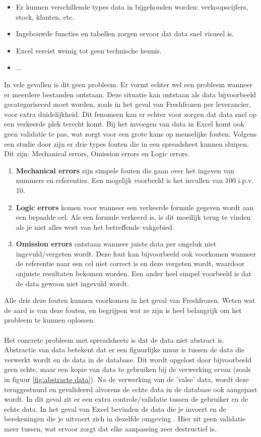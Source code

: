 \begin{itemize}
    \item Er kunnen verschillende types data in bijgehouden worden: verkoopscijfers, stock, klanten, etc.
    \item Ingebouwde functies en tabellen zorgen ervoor dat data snel visueel is.
    \item Excel vereist weinig tot geen technische kennis.
    \item ...
\end{itemize}
In vele gevallen is dit geen probleem. Er vormt echter wel een probleem wanneer er meerdere bestanden ontstaan. Deze situatie kan ontstaan als data bijvoorbeeld gecategoriseerd moet worden, zoals in het geval van Freshfrozen per leverancier, voor extra duidelijkheid. Dit fenomeen kan er echter voor zorgen dat data snel op een verkeerde plek terecht komt. Bij het invoegen van data in Excel komt ook geen validatie te pas, wat zorgt voor een grote kans op menselijke fouten. Volgens een studie door \textcite{Aburas2019} zijn er drie types fouten die in een spreadsheet kunnen sluipen. Dit zijn: Mechanical errors, Omission errors en Logic errors. 
\begin{enumerate}
    \item \textbf{Mechanical errors} zijn simpele fouten die gaan over het ingeven van nummers en referenties. Een mogelijk voorbeeld is het invullen van 100 i.p.v. 10.
    \item \textbf{Logic errors} komen voor wanneer een verkeerde formule gegeven wordt aan een bepaalde cel. Als een formule verkeerd is, is dit moeilijk terug te vinden als je niet alles weet van het betreffende vakgebied.
    \item \textbf{Omission errors} ontstaan wanneer juiste data per ongeluk niet ingevuld/vergeten wordt. Deze fout kan bijvoorbeeld ook voorkomen wanneer de referentie naar een cel niet correct is en deze vergeten wordt, waardoor onjuiste resultaten bekomen worden. Een ander heel simpel voorbeeld is dat de data gewoon niet ingevuld wordt.
\end{enumerate}
  Alle drie deze fouten kunnen voorkomen in het geval van Freshfrozen. Weten wat de aard is van deze fouten, en begrijpen wat ze zijn is heel belangrijk om het probleem te kunnen oplossen.
 \\
 \\
Het concrete probleem met spreadsheets is dat de data niet abstract is. Abstractie van data betekent dat er een figuurlijke muur is tussen de data die verwerkt wordt en de data in de database. Dit wordt opgelost door bijvoorbeeld geen echte, maar een kopie van data te gebruiken bij de verwerking ervan (zoals in figuur \ref{fig:abstracte data}). Na de verwerking van de 'valse' data, wordt deze teruggestuurd en gevalideerd alvorens de echte data in de database ook aangepast wordt. In dit geval zit er een extra controle/validatie tussen de gebruiker en de echte data. In het geval van Excel bevinden de data die je invoert en de berekeningen die je uitvoert zich in dezelfde omgeving \autocite{Aburas2019}. Hier zit geen validatie meer tussen, wat ervoor zorgt dat elke aanpassing zeer destructief is.
